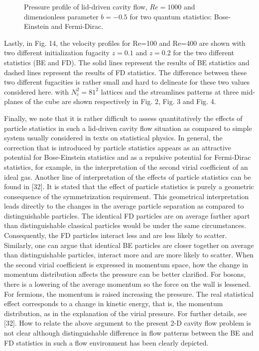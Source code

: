 \documentclass[doublecol]{epl2}
\begin{document}
\begin{figure}[ht]
	\centering
	\vfill
	\caption[A set of four subfigures.]{Pressure profile of lid-driven cavity flow, $Re=1000$ and dimensionless parameter $b=-0.5$ for two quantum statistics:
	 Bose-Einstein and 
	 Fermi-Dirac.}
	\label{fig:pressure_profile_bn05}
\end{figure}


Lastly, in Fig. 14, the velocity profiles for Re=100 and Re=400 are shown with two different initialization fugacity $z=0.1$ and $z=0.2$ for the two different statistics (BE and FD).   The solid lines represent the results of BE statistics and dashed lines represent the results of FD statistics.  The difference between these two different fugacities is rather small and hard to delineate for these two values considered here.
with $N_c^2=81^2$ lattices and the streamlines patterns at three mid-planes of the cube are shown respectively in Fig. 2, Fig. 3 and Fig. 4.

Finally, we note that it is rather difficult to assess quantitatively the effects of particle statistics in such a lid-driven cavity flow situation as compared to simple system usually considered in texts on statistical physics. In general, the correction that is introduced by particle statistics appears as an attractive potential for Bose-Einstein statistics and as a repulsive potential for Fermi-Dirac statistics, for example, in the interpretation of the second virial coefficient of an ideal gas. Another line of interpretation of the effects of particle statistics can be found in [32].
It is stated that the effect of particle statistics is purely a geometric consequence of the symmetrization requirement. This geometrical interpretation leads directly to the changes in the average particle separation as compared to distinguishable particles. The identical FD particles are on average farther apart than distinguishable classical particles would be under the same circumstances. Consequently, the FD particles interact less and are less likely to scatter. Similarly, one can argue that identical BE particles are closer together on average than distinguishable particles, interact more and are more likely to scatter. When the second virial coefficient is expressed in momentum space, how the change in momentum distribution affects the pressure can be better clarified. For bosons, there is a lowering of the average momentum so the force on the wall is lessened.  For fermions, the momentum is raised increasing the pressure. The real statistical effect corresponds to a change in kinetic energy, that is, the momentum distribution, as in the explanation of the virial pressure. For further details, see [32]. How to relate the above argument to the present 2-D cavity flow problem is not clear although distinguishable difference in flow patterns between the BE and FD statistics in such a flow environment has been clearly depicted.
\end{document}
